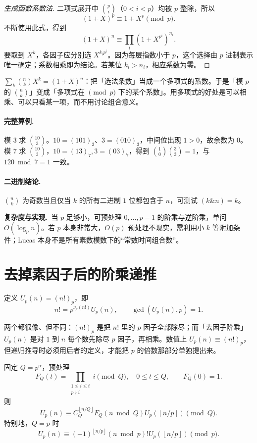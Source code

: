 \documentclass[UTF8,a4paper,11pt,oneside,openany,fontset=fandol]{ctexbook}
\theoremstyle{definition}
\newcommand{\floor}[1]{\left\lfloor #1\right\rfloor}
\newcommand{\cost}{\par\noindent\textbf{复杂度与实现.}\ }
\begin{document}
\begin{proof}[生成函数系数法]
二项式展开中 $\binom pi$（$0<i<p$）均被 $p$ 整除，所以
\[
(1+X)^p\equiv1+X^p\pmod p.
\]
不断使用此式，得到
\[
 (1+X)^n\equiv\prod_i(1+X^{p^i})^{n_i}.
\]
要取到 $X^k$，各因子应分别选 $X^{k_ip^i}$。因为每层指数小于 $p$，这个选择由 $p$ 进制表示唯一确定；系数相乘即为结论。若某位 $k_i>n_i$，相应系数为零。
\end{proof}

\begin{tip}
$\sum_k\binom nk X^k=(1+X)^n$：把「选法条数」当成一个多项式的系数。于是「模 $p$ 的 $\binom nk$」变成「多项式在 $\pmod p$ 下的某个系数」。用多项式的好处是可以相乘、可以只看某一项，而不用讨论组合意义。
\end{tip}

\paragraph{完整算例.} 模 $3$ 求 $\binom{10}{3}$。$10=(101)_3$、$3=(010)_3$，中间位出现 $1>0$，故余数为 $0$。模 $7$ 求 $\binom{10}{3}$，$10=(13)_7,3=(03)_7$，得到 $\binom10\binom33=1$，与 $120\bmod7=1$ 一致。
\paragraph{二进制结论.} $\binom nk$ 为奇数当且仅当 $k$ 的所有二进制 $1$ 位都包含于 $n$，可测试 $(k\mathbin{\&}n)=k$。
\cost 当 $p$ 足够小，可预处理 $0,\ldots,p-1$ 的阶乘与逆阶乘，单问 $O(\log_p n)$。若 $p$ 本身非常大，$O(p)$ 预处理不现实，需利用小 $k$ 等附加条件；Lucas 本身不是所有素数模数下的“常数时间组合数”。


\section{去掉素因子后的阶乘递推}
定义 $U_p(n)=(n!)_p$，即
\[
 n!=p^{\nu_p(n!)}U_p(n),\qquad\gcd(U_p(n),p)=1.
\]

\begin{tip}[$(n!)_p$ 与 $U_p(n)$ 的区别]
两个都很像、但不同：$(n!)_p$ 是把 $n!$ 里的 $p$ 因子全部除尽；而「去因子阶乘」$U_p(n)$ 是对 $1$ 到 $n$ 每个数先除尽 $p$ 因子，再相乘。数值上 $U_p(n)\equiv(n!)_p$，但递归推导时必须用后者的定义，才能把 $p$ 的倍数那部分单独提出来。
\end{tip}

固定 $Q=p^\alpha$，预处理
\[
 F_Q(t)=\prod_{\substack{1\le i\le t\\p\nmid i}}i\pmod Q,\quad0\le t\le Q,\qquad F_Q(0)=1.
\]
则
\[
 U_p(n)\equiv C_Q^{\floor{n/Q}}F_Q(n\bmod Q)
 U_p(\floor{n/p})\pmod Q.
\]
特别地，$Q=p$ 时
\[
 U_p(n)\equiv(-1)^{\floor{n/p}}(n\bmod p)!
 U_p(\floor{n/p})\pmod p.
\]
\end{document}
